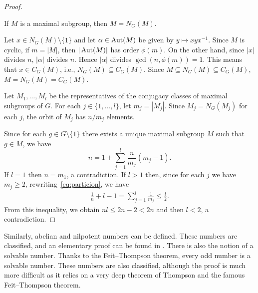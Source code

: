 \begin{proof}
    \begin{claim}
    If $M$ is a maximal subgroup, then $M=N_G(M)$.
    \end{claim}

    Let $x\in N_G(M)\setminus\{1\}$ and let $\alpha\in\operatorname{Aut}(M)$ be given by $y\mapsto xyx^{-1}$. Since $M$ is cyclic, if $m=|M|$, then $|\operatorname{Aut}(M)|$ has order $\phi(m)$. On the other hand, since $|x|$ divides $n$, $|\alpha|$ divides $n$. Hence $|\alpha|$ divides $\gcd(n,\phi(m))=1$. This means that $x\in C_G(M)$, i.e., $N_G(M)\subseteq C_G(M)$. Since $M\subseteq N_G(M)\subseteq C_G(M)$, $M=N_G(M)=C_G(M)$.

    Let $M_1,\dots,M_l$ be the representatives of the conjugacy classes of maximal subgroups of $G$. For each $j\in\{1,\dots,l\}$, let $m_j=|M_j|$. Since $M_{j}=N_G(M_j)$ for each $j$, the orbit of $M_j$ has $n/m_j$ elements.

    Since for each $g\in G\setminus\{1\}$ there exists a unique maximal subgroup $M$ such that $g\in M$, we have
    \begin{equation}
    \label{eq:particion}
    n=1+\sum_{j=1}^l \frac{n}{m_j}(m_j-1).
    \end{equation}
    If $l=1$ then $n=m_1$, a contradiction. If $l>1$ then, since for each $j$ we have $m_j\geq2$, rewriting~\eqref{eq:particion}, we have
    \begin{align*}
    \frac{1}{n}+l-1=\sum_{j=1}^l\frac{1}{m_j}\leq\frac{l}{2}.
    \end{align*}
    From this inequality, we obtain $nl\leq 2n-2<2n$ and then $l<2$, a contradiction. 
\end{proof}

Similarly, abelian and nilpotent numbers can be defined. These numbers are classified, and an elementary proof can be found in \cite{MR1786236}. There is also the notion of a solvable number. Thanks to the Feit--Thompson theorem, every odd number is a solvable number. These numbers are also classified, although the proof is much more difficult as it relies on a very deep theorem of Thompson and the famous Feit--Thompson theorem.

